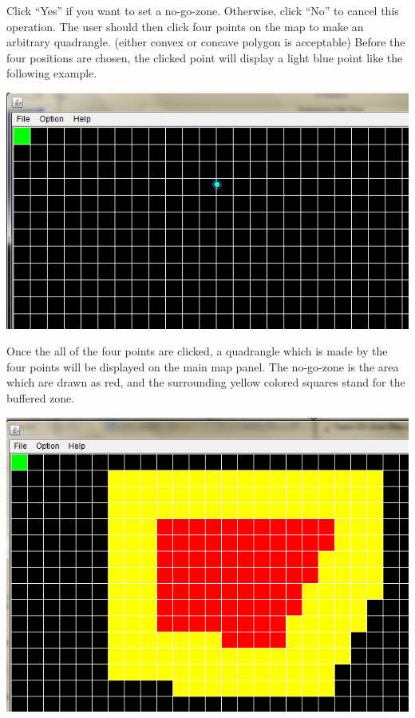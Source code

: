 \documentclass[11pt, a4paper]{report}
\begin{document}
Click ``Yes'' if you want to set a no-go-zone. Otherwise, click ``No'' to cancel this operation.
The user should then click four points on the map to make an arbitrary quadrangle. (either convex or concave polygon is acceptable) Before the four positions are chosen, the clicked point will display a light blue point like the following example.

\begin{center}
\includegraphics[scale=0.5]{./image/NoGoZoneClick1.png}\\[1cm]
\end{center}



Once the all of the four points are clicked, a quadrangle which is made by the four points will be displayed on the main map panel. The no-go-zone is the area which are drawn as red, and the surrounding yellow colored squares stand for the buffered zone. 

\begin{center}
\includegraphics[scale=0.7]{./image/NoGoZoneClick4.png}\\[1cm]
\end{center}
\end{document}
